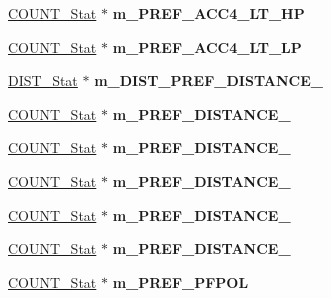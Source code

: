 \begin{DoxyCompactItemize}
\item 
\hypertarget{classall__stats__c_a064cd1c4c9bd47f14a3a6c58d1dd0ecc}{
\hyperlink{classCOUNT__Stat}{COUNT\_\-Stat} $\ast$ {\bfseries m\_\-PREF\_\-ACC4\_\-LT\_\-HP}}
\label{classall__stats__c_a064cd1c4c9bd47f14a3a6c58d1dd0ecc}

\item 
\hypertarget{classall__stats__c_a44ef445dc0fecb84931c4bf080bd2b60}{
\hyperlink{classCOUNT__Stat}{COUNT\_\-Stat} $\ast$ {\bfseries m\_\-PREF\_\-ACC4\_\-LT\_\-LP}}
\label{classall__stats__c_a44ef445dc0fecb84931c4bf080bd2b60}

\item 
\hypertarget{classall__stats__c_a59c719f202da7d6bdf364e73df1186ae}{
\hyperlink{classDIST__Stat}{DIST\_\-Stat} $\ast$ {\bfseries m\_\-DIST\_\-PREF\_\-DISTANCE\_}}
\label{classall__stats__c_a59c719f202da7d6bdf364e73df1186ae}

\item 
\hypertarget{classall__stats__c_af58d31dc36d70e6e9676f271a054ab8b}{
\hyperlink{classCOUNT__Stat}{COUNT\_\-Stat} $\ast$ {\bfseries m\_\-PREF\_\-DISTANCE\_}}
\label{classall__stats__c_af58d31dc36d70e6e9676f271a054ab8b}

\item 
\hypertarget{classall__stats__c_a1f353c8bca15c663df343ae101c85a10}{
\hyperlink{classCOUNT__Stat}{COUNT\_\-Stat} $\ast$ {\bfseries m\_\-PREF\_\-DISTANCE\_}}
\label{classall__stats__c_a1f353c8bca15c663df343ae101c85a10}

\item 
\hypertarget{classall__stats__c_a9f53cd0a785a0e0fbeddcde74fe03143}{
\hyperlink{classCOUNT__Stat}{COUNT\_\-Stat} $\ast$ {\bfseries m\_\-PREF\_\-DISTANCE\_}}
\label{classall__stats__c_a9f53cd0a785a0e0fbeddcde74fe03143}

\item 
\hypertarget{classall__stats__c_a2b06f99cd2897b6377e8143b4ec1c861}{
\hyperlink{classCOUNT__Stat}{COUNT\_\-Stat} $\ast$ {\bfseries m\_\-PREF\_\-DISTANCE\_}}
\label{classall__stats__c_a2b06f99cd2897b6377e8143b4ec1c861}

\item 
\hypertarget{classall__stats__c_a478c47e274080da1f8bcf128b4ddea49}{
\hyperlink{classCOUNT__Stat}{COUNT\_\-Stat} $\ast$ {\bfseries m\_\-PREF\_\-DISTANCE\_}}
\label{classall__stats__c_a478c47e274080da1f8bcf128b4ddea49}

\item 
\hypertarget{classall__stats__c_a828f2ddae1cde77ac28d61e81f47aacc}{
\hyperlink{classCOUNT__Stat}{COUNT\_\-Stat} $\ast$ {\bfseries m\_\-PREF\_\-PFPOL}}
\label{classall__stats__c_a828f2ddae1cde77ac28d61e81f47aacc}


\end{DoxyCompactItemize}
